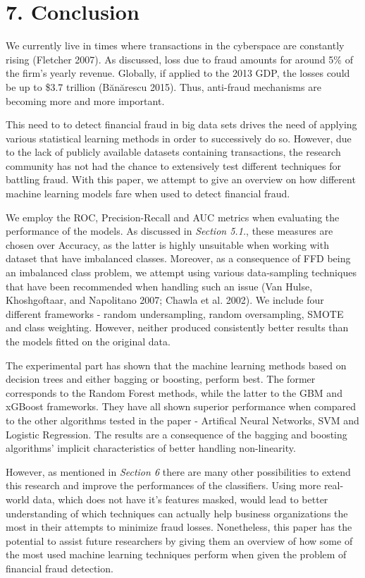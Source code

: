 \documentclass[12pt,]{article}
\begin{document}
\hypertarget{conclusion}{%
\section{7. Conclusion}\label{conclusion}}

We currently live in times where transactions in the cyberspace are
constantly rising (Fletcher 2007). As discussed, loss due to fraud
amounts for around 5\% of the firm's yearly revenue. Globally, if
applied to the 2013 GDP, the losses could be up to \$3.7 trillion
(Bănărescu 2015). Thus, anti-fraud mechanisms are becoming more and more
important.

This need to to detect financial fraud in big data sets drives the need
of applying various statistical learning methods in order to
successively do so. However, due to the lack of publicly available
datasets containing transactions, the research community has not had the
chance to extensively test different techniques for battling fraud. With
this paper, we attempt to give an overview on how different machine
learning models fare when used to detect financial fraud.

We employ the ROC, Precision-Recall and AUC metrics when evaluating the
performance of the models. As discussed in \emph{Section 5.1.}, these
measures are chosen over Accuracy, as the latter is highly unsuitable
when working with dataset that have imbalanced classes. Moreover, as a
consequence of FFD being an imbalanced class problem, we attempt using
various data-sampling techniques that have been recommended when
handling such an issue (Van Hulse, Khoshgoftaar, and Napolitano 2007;
Chawla et al. 2002). We include four different frameworks - random
undersampling, random oversampling, SMOTE and class weighting. However,
neither produced consistently better results than the models fitted on
the original data.

The experimental part has shown that the machine learning methods based
on decision trees and either bagging or boosting, perform best. The
former corresponds to the Random Forest methods, while the latter to the
GBM and xGBoost frameworks. They have all shown superior performance
when compared to the other algorithms tested in the paper - Artifical
Neural Networks, SVM and Logistic Regression. The results are a
consequence of the bagging and boosting algorithms' implicit
characteristics of better handling non-linearity.

However, as mentioned in \emph{Section 6} there are many other
possibilities to extend this research and improve the performances of
the classifiers. Using more real-world data, which does not have it's
features masked, would lead to better understanding of which techniques
can actually help business organizations the most in their attempts to
minimize fraud losses. Nonetheless, this paper has the potential to
assist future researchers by giving them an overview of how some of the
most used machine learning techniques perform when given the problem of
financial fraud detection.
\end{document}
